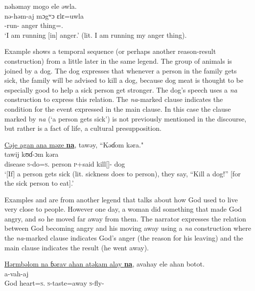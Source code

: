       \clearpage
nəhəmay  mogo  ele  əwla.\\      
\gll nə-həm-aj  mɔgʷɔ  ɛlɛ=uwla\\ 
     {\oneS}-run{}-{\CL}      anger  thing={\oneS}.{\POSS}\\
\glt  ‘I am running [in] anger.’ (lit. I am running my anger thing). 
\z

\largerpage
Example  shows a temporal sequence (or perhaps another reason-result construction) from a little later in the same legend. The group of animals is joined by a dog. The dog expresses that whenever a person in the family gets sick, the family will be advised to kill a dog, because dog meat is thought to be especially good to help a sick person get stronger. The dog’s speech uses a \textit{na} construction to express this relation. The \textit{na}-marked clause indicates the condition for the event expressed in the main clause. In this case the clause marked by \textit{na}{} (‘a person gets sick’) is not previously mentioned in the discourse, but rather is a fact of life, a cultural presupposition. 

\ea \label{ex:11:16}
\underline{Cəje  agan  ana  məze  \textbf{na}},  tawəy,  “Kəɗom  kəra."\\
\gll  {}               tawij   kʊɗ-ɔm     kəra\\
      disease  \textsc{s}-do=\textsc{s}.{\IO}  {\DAT} person  {\PSP}  \textsc{p}+said  kill[{\IMP}]-{\twoP}  dog\\
\glt  ‘[If] a person gets sick (lit. sickness does to person), they say, “Kill a dog!” [for the sick person to eat].’ 
\z

Examples  and  are from another legend that talks about how God used to live very close to people. However one day, a woman did something that made God angry, and so he moved far away from them. The narrator expresses the relation between God becoming angry and his moving away using a \textit{na} construction  where the \textit{na}-marked clause indicates God’s anger (the reason for his leaving) and the main clause indicates the result (he went away). 

\ea \label{ex:11:17}
\underline{Hərmbəlom  na  ɓərav  ahan  atəkam  alay  \textbf{na}},  avahay  ele  ahan  botot.\\
\gll  {}       a-vah-aj \\ 
      God  {\PSP}  heart=\textsc{s}.{\POSS} \textsc{s}-taste=away {\PSP} \textsc{s}-fly{}-{\CL}  \\  
      
